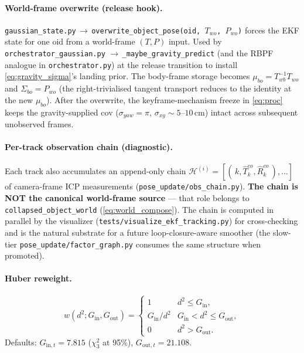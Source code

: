 \documentclass[11pt]{article}
\newcommand{\file}[1]{\texttt{#1}}
\begin{document}
\paragraph{World-frame overwrite (release hook).}
\file{gaussian\_state.py}\,$\to$\,\texttt{overwrite\_object\_pose(oid,
$T_{wo}$, $P_{wo}$)} forces the EKF state for one oid from a
world-frame $(T,P)$ input. Used by \file{orchestrator\_gaussian.py}
$\to$\,\texttt{\_maybe\_gravity\_predict} (and the RBPF analogue in
\file{orchestrator.py}) at the release transition to install
\eqref{eq:gravity_sigma}'s landing prior. The body-frame storage
becomes $\mu_{bo}=T_{wb}^{-1}T_{wo}$ and $\Sigma_{bo}=P_{wo}$ (the
right-trivialised tangent transport reduces to the identity at the
new $\mu_{bo}$). After the overwrite, the keyframe-mechanism freeze
in \eqref{eq:proc} keeps the gravity-supplied cov
($\sigma_{yaw}=\pi$, $\sigma_{xy}\!\sim\!5$–$10\,$cm) intact across
subsequent unobserved frames.

\paragraph{Per-track observation chain (diagnostic).}\label{sec:chain}
Each track also accumulates an append-only chain
$\mathcal{H}^{(i)} = [(\,k,\hat T^{co}_k,\hat R^{co}_k\,),\ldots]$ of
camera-frame ICP measurements (\file{pose\_update/obs\_chain.py}).
\textbf{The chain is NOT the canonical world-frame source} — that
role belongs to \texttt{collapsed\_object\_world}
(\eqref{eq:world_compose}). The chain is computed in parallel by the
visualizer (\file{tests/visualize\_ekf\_tracking.py}) for
cross-checking and is the natural substrate for a future
loop-closure-aware smoother (the slow-tier
\file{pose\_update/factor\_graph.py} consumes the same structure when
promoted).

\paragraph{Huber reweight.}
\begin{equation}\label{eq:huber_w}
w(d^2; G_{\text{in}}, G_{\text{out}}) = \begin{cases}
1 & d^2 \le G_{\text{in}}, \\
G_{\text{in}}/d^2 & G_{\text{in}} < d^2 \le G_{\text{out}}, \\
0 & d^2 > G_{\text{out}}.
\end{cases}
\end{equation}
Defaults: $G_{\text{in},t}=7.815$ ($\chi^2_3$ at 95\%),
$G_{\text{out},t}=21.108$.
\end{document}
